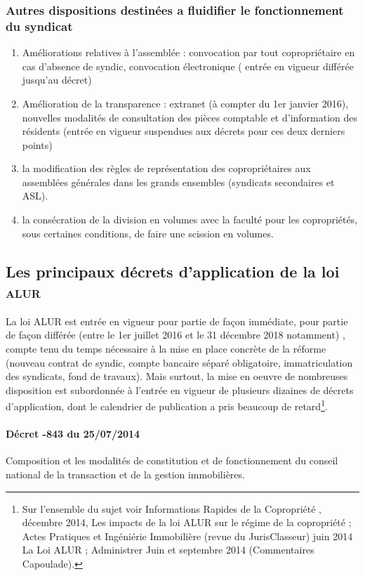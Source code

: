			\subsubsection{Autres dispositions destinées a fluidifier le fonctionnement du syndicat}
			\begin{enumerate}
				\item Améliorations relatives à l’assemblée : convocation par tout copropriétaire en cas d’absence de syndic, convocation électronique ( entrée en vigueur différée jusqu’au décret)
				\item Amélioration de la transparence : extranet (à compter du 1er janvier 2016), nouvelles modalités de consultation des pièces comptable et d’information des résidents (entrée en vigueur suspendues aux décrets pour ces deux derniers points)
				\item la modification des règles de représentation des copropriétaires aux assemblées générales dans les grands ensembles (syndicats secondaires et ASL).
				\item la consécration de la division en volumes avec la faculté pour les copropriétés, sous certaines conditions, de faire une scission en volumes.
			\end{enumerate}
			
		\subsection{Les principaux décrets d’application de la loi \textsc{alur}}	
			La loi ALUR est entrée en vigueur pour partie de façon immédiate, pour partie de façon différée (entre le 1er juillet 2016 et le 31 décembre 2018 notamment) , compte tenu du temps nécessaire à la mise en place concrète de la réforme (nouveau contrat de syndic, compte bancaire séparé obligatoire, immatriculation des syndicats, fond de travaux).
			Mais surtout, la mise en oeuvre de nombreuses disposition est subordonnée à l’entrée en vigueur de plusieurs dizaines de décrets d’application, dont le calendrier de publication a pris beaucoup de retard\footnote{Sur l’ensemble du sujet voir Informations Rapides de la Copropriété , décembre 2014, Les impacts de la loi ALUR sur le régime de la copropriété ; Actes Pratiques et Ingéniérie Immobilière (revue du JurisClasseur) juin 2014 La Loi ALUR ; Administrer Juin et septembre 2014 (Commentaires Capoulade).}. 

			\paragraph{Décret -843 du 25/07/2014} Composition et les modalités de constitution et de fonctionnement du conseil national de la transaction et de la gestion immobilières.
			

